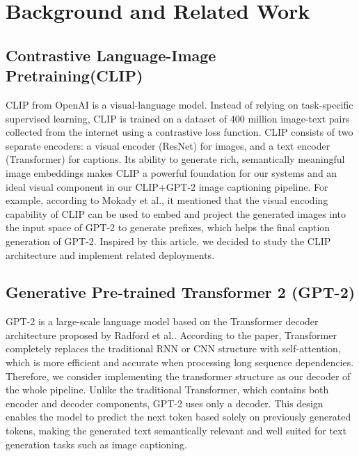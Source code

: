 \documentclass[11pt]{article}
\begin{document}
\section{Background and Related Work}

    \subsection{Contrastive Language-Image Pretraining(CLIP)}
    CLIP from OpenAI is a visual-language model. Instead of relying on 
    task-specific supervised learning, CLIP is trained on a dataset of 400
    million image-text pairs collected from the internet using a contrastive 
    loss function. CLIP consists of two separate encoders: a visual encoder 
    (ResNet) for images, and a text encoder (Transformer) for captions. 
    Its ability to generate rich, semantically meaningful image 
    embeddings makes CLIP a powerful foundation for our systems and 
    an ideal visual component in our CLIP+GPT-2 image captioning pipeline. 
    For example, according to Mokady et al.\cite{Mokady2021}, it mentioned that the visual encoding capability of 
    CLIP can be used to embed and project the generated images into the input 
    space of GPT-2 to generate prefixes, which helps the final caption generation of GPT-2. Inspired by this article, we decided to study the CLIP architecture and implement related deployments.

    \subsection{Generative Pre-trained Transformer 2 (GPT-2)}
    GPT-2 is a large-scale language model based on the Transformer 
    decoder architecture proposed by Radford et al.\cite{Radford}. 
    According to the paper, Transformer completely replaces the traditional RNN or 
    CNN structure with self-attention, which is more efficient and accurate when processing 
    long sequence dependencies. Therefore, we consider implementing the transformer 
    structure as our decoder of the whole pipeline. Unlike the traditional 
    Transformer, which contains both encoder and decoder components, 
    GPT-2 uses only a decoder. This design enables the model to predict the next token based solely on previously generated tokens, 
    making the generated text semantically relevant and well suited for text generation tasks such as image captioning.
    
\end{document}
